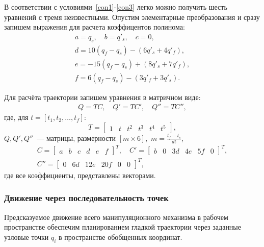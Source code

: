 В соответствии с условиями~\eqref{con1}-\eqref{con3} легко можно получить шесть уравнений с тремя неизвестными. Опустим элементарные преобразования и сразу запишем выражения для расчета коэффицентов полинома:
\begin{gather}
	a = q_s, \quad b = q'_s, \quad c = 0, \\
    d = 10 (q_f - q_s) - (6  q'_s + 4  q'_f), \\ 
    e = -15  (q_f - q_s) + (8  q'_s + 7  q'_f), \\
    f = 6  (q_f - q_s) - (3  q'_f + 3  q'_s).
\end{gather}

Для расчёта траектории запишем уравнения в матричном виде:
\begin{gather}
	Q = T C, \quad Q' = T C', \quad Q'' = T C'',
\end{gather}
где, для $ t = [t_1, t_2, \dots, t_f] $:
\begin{equation}
	T = 
	\begin{bmatrix}
		1 & t & t^2 & t^3 & t^4 & t^5 
	\end{bmatrix}\!\!,
\end{equation}
$ Q, Q', Q'' $~--- матрицы, размерности $ [m \times 6],\,\,m = \frac{t_f - t_s}{dt} $,
\begin{gather}
	C =
	\begin{bmatrix}
		a &b &c &d &e &f
	\end{bmatrix}^T,
	\quad
	C' = 
	\begin{bmatrix}
		b &0 &3 d& 4 e& 5 f& 0
	\end{bmatrix}^T,
	\\
	C'' = 
	\begin{bmatrix}
		0 &6 d &12 e &20 f &0 &0
	\end{bmatrix}^T,
\end{gather}
где все коэффициенты, представлены векторами.

\vspace{0.5cm}
\subsubsection{Движение через последовательность точек}

Предсказуемое движение всего манипуляционного механизма в рабочем пространстве обеспечим планированием гладкой траектории через заданные узловые точки $ q_i  $ в пространстве обобщенных координат. 

